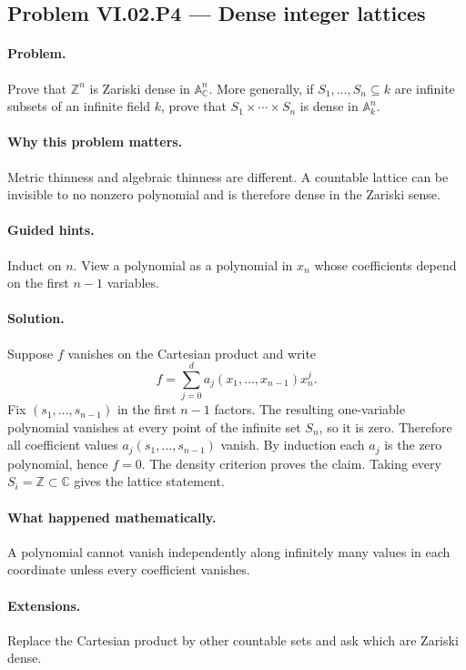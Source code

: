 \subsection*{Problem VI.02.P4 --- Dense integer lattices}
\label{prob:vi02-p4}

\paragraph{Problem.}
Prove that \(\mathbb Z^n\) is Zariski dense in \(\mathbb A_{\mathbb C}^n\).  More generally,
if \(S_1,\dots,S_n\subseteq k\) are infinite subsets of an infinite field \(k\), prove that
\(S_1\times\cdots\times S_n\) is dense in \(\mathbb A_k^n\).

\ifdefined\FullProblemDossiers
\paragraph{Why this problem matters.}
Metric thinness and algebraic thinness are different.  A countable lattice can be invisible
to no nonzero polynomial and is therefore dense in the Zariski sense.

\paragraph{Guided hints.}
Induct on \(n\).  View a polynomial as a polynomial in \(x_n\) whose coefficients depend on
the first \(n-1\) variables.

\paragraph{Solution.}
Suppose \(f\) vanishes on the Cartesian product and write
\[
f=\sum_{j=0}^d a_j(x_1,\dots,x_{n-1})x_n^j.
\]
Fix \((s_1,\dots,s_{n-1})\) in the first \(n-1\) factors.  The resulting one-variable
polynomial vanishes at every point of the infinite set \(S_n\), so it is zero.  Therefore
all coefficient values \(a_j(s_1,\dots,s_{n-1})\) vanish.  By induction each \(a_j\) is the
zero polynomial, hence \(f=0\).  The density criterion proves the claim.  Taking every
\(S_i=\mathbb Z\subset\mathbb C\) gives the lattice statement.

\paragraph{What happened mathematically.}
A polynomial cannot vanish independently along infinitely many values in each coordinate
unless every coefficient vanishes.

\paragraph{Extensions.}
Replace the Cartesian product by other countable sets and ask which are Zariski dense.
\fi
